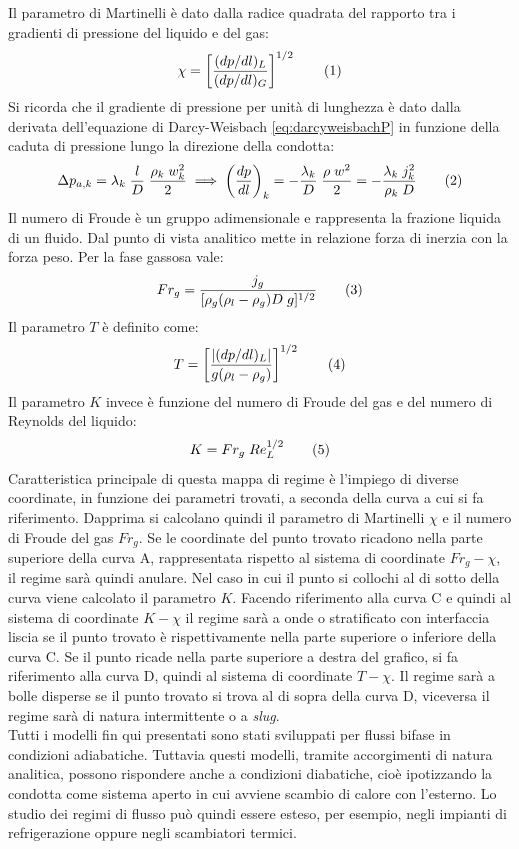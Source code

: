 Il parametro di Martinelli è dato dalla radice quadrata del rapporto tra i gradienti di pressione del liquido e del gas:
\[\chi = \left[ \frac{(dp/dl)_L}{(dp/dl)_G} \right]^{1/2} \addtag \label{eq:martinelli} \]
Si ricorda che il gradiente di pressione per unità di lunghezza è dato dalla derivata dell'equazione di Darcy-Weisbach \eqref{eq:darcyweisbachP} in funzione della caduta di pressione lungo la direzione della condotta:
\[\Delta p_{a,k} = \lambda_k \; \frac{l}{D} \; \frac{\rho_k \; w_k^2}{2} \implies \left(\dfrac{dp}{dl}\right)_k =- \frac{\lambda_k}{D} \; \frac{\rho \; w^2}{2} = - \frac{\lambda_k \; j_k^2}{\rho_k \; D}  \addtag \label{eq:gradientepressione} \]
Il numero di Froude è un gruppo adimensionale e rappresenta la frazione liquida di un fluido.  Dal punto di vista analitico mette in relazione forza di inerzia con la forza peso. Per la fase gassosa vale:
\[Fr_g = \frac{j_g}{[\rho_g(\rho_l-\rho_g)D \; g]^{1/2}} \addtag \label{eq:froude}\]
Il parametro \(T\) è definito come:
\[ T = \left[ \dfrac{|(dp/dl)_L|}{g(\rho_l-\rho_g)} \right]^{1/2} \addtag \label{parametroT} \]
Il parametro \(K\) invece è funzione del numero di Froude del gas e del numero di Reynolds del liquido:
\[K=Fr_g \; Re_L^{1/2} \addtag \label{parametroK} \]
Caratteristica principale di questa mappa di regime è l'impiego di diverse coordinate, in funzione dei parametri trovati, a seconda della curva a cui si fa riferimento. Dapprima si calcolano quindi il parametro di Martinelli \(\chi\) e il numero di Froude del gas \(Fr_g\). Se le coordinate del punto trovato ricadono nella parte superiore della curva A, rappresentata rispetto al sistema di coordinate \(Fr_g-\chi\), il regime sarà quindi anulare. Nel caso in cui il punto si collochi al di sotto della curva viene calcolato il parametro \(K\). Facendo riferimento alla curva C e quindi al sistema di coordinate \(K-\chi\) il regime sarà a onde o stratificato con interfaccia liscia se il punto trovato è rispettivamente nella parte superiore o inferiore della curva C. Se il punto ricade nella parte superiore a destra del grafico, si fa riferimento alla curva D, quindi al sistema di coordinate \(T - \chi \). Il regime sarà a bolle disperse se il punto trovato si trova al di sopra della curva D, viceversa il regime sarà di natura intermittente o a \textit{slug}. \\
Tutti i modelli fin qui presentati sono stati sviluppati per flussi bifase in condizioni adiabatiche. Tuttavia questi modelli, tramite accorgimenti di natura analitica, possono rispondere anche a condizioni diabatiche, cioè ipotizzando la condotta come sistema aperto in cui avviene scambio di calore con l'esterno. Lo studio dei regimi di flusso può quindi essere esteso, per esempio, negli impianti di refrigerazione oppure negli scambiatori termici.

